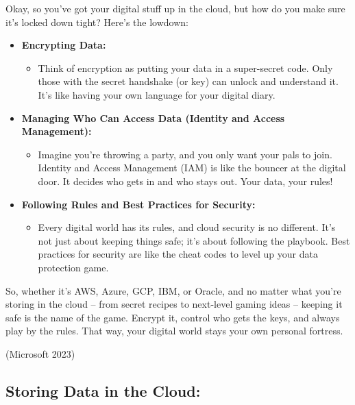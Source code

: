 \documentclass[
  letterpaper,
  DIV=11,
  numbers=noendperiod]{scrreprt}
\providecommand{\tightlist}{%
  \setlength{\itemsep}{0pt}\setlength{\parskip}{0pt}}\usepackage{longtable,booktabs,array}
\begin{document}
Okay, so you've got your digital stuff up in the cloud, but how do you
make sure it's locked down tight? Here's the lowdown:

\begin{itemize}
\item
  \textbf{Encrypting Data:}

  \begin{itemize}
  \tightlist
  \item
    Think of encryption as putting your data in a super-secret code.
    Only those with the secret handshake (or key) can unlock and
    understand it. It's like having your own language for your digital
    diary.
  \end{itemize}
\item
  \textbf{Managing Who Can Access Data (Identity and Access
  Management):}

  \begin{itemize}
  \tightlist
  \item
    Imagine you're throwing a party, and you only want your pals to
    join. Identity and Access Management (IAM) is like the bouncer at
    the digital door. It decides who gets in and who stays out. Your
    data, your rules!
  \end{itemize}
\item
  \textbf{Following Rules and Best Practices for Security:}

  \begin{itemize}
  \tightlist
  \item
    Every digital world has its rules, and cloud security is no
    different. It's not just about keeping things safe; it's about
    following the playbook. Best practices for security are like the
    cheat codes to level up your data protection game.
  \end{itemize}
\end{itemize}

So, whether it's AWS, Azure, GCP, IBM, or Oracle, and no matter what
you're storing in the cloud -- from secret recipes to next-level gaming
ideas -- keeping it safe is the name of the game. Encrypt it, control
who gets the keys, and always play by the rules. That way, your digital
world stays your own personal fortress.

(Microsoft 2023)

\subsection{Storing Data in the Cloud:}\label{storing-data-in-the-cloud}
\end{document}
